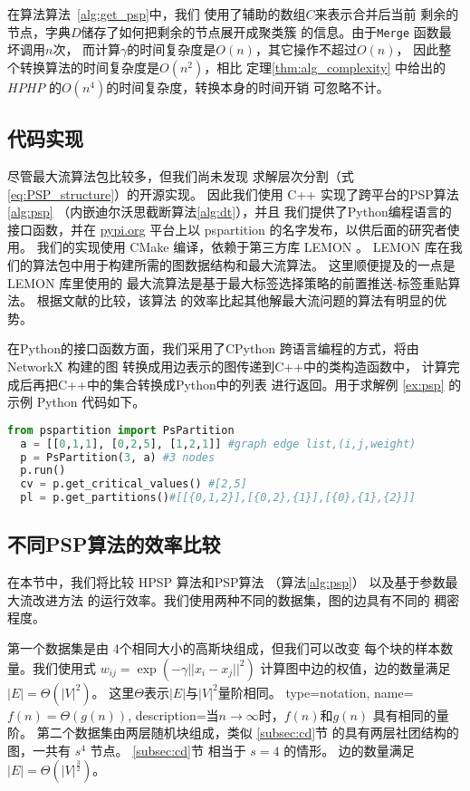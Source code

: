 在算法算法~\ref{alg:get_psp}中，我们
使用了辅助的数组$C$来表示合并后当前
剩余的节点，字典$D$储存了如何把剩余的节点展开成聚类簇
的信息。由于\texttt{Merge} 函数最坏调用$n$次，
而计算$\gamma$的时间复杂度是$O(n)$，其它操作不超过$O(n)$，
因此整个转换算法的时间复杂度是$O(n^2)$，相比
定理\ref{thm:alg_complexity}
中给出的$HPHP$ 的$O(n^4)$的时间复杂度，转换本身的时间开销
可忽略不计。

\subsection{代码实现}
尽管最大流算法包比较多，但我们尚未发现
求解层次分割（式\eqref{eq:PSP_structure}）的开源实现。
因此我们使用 C++ 实现了跨平台的PSP算法\ref{alg:psp}
（内嵌迪尔沃思截断算法\ref{alg:dt}），并且
我们提供了Python编程语言的接口函数，并在 \url{pypi.org}
平台上以 pspartition
的名字发布，以供后面的研究者使用。
我们的实现使用 CMake 编译，依赖于第三方库 LEMON \cite{dezsHo2011lemon}。 
LEMON 库在我们的算法包中用于构建所需的图数据结构和最大流算法。
这里顺便提及的一点是 LEMON 库里使用的
最大流算法是基于最大标签选择策略的前置推送-标签重贴算法。
根据文献\citet{ahuja1997computational}的比较，该算法
的效率比起其他解最大流问题的算法有明显的优势。

在Python的接口函数方面，我们采用了CPython
跨语言编程的方式，将由 NetworkX \cite{SciPyProceedings_11} 构建的图
转换成用边表示的图传递到C++中的类构造函数中，
计算完成后再把C++中的集合转换成Python中的列表
进行返回。用于求解例 \ref{ex:psp}
的示例 Python 代码如下。
\begin{lstlisting}[language=Python]
  from pspartition import PsPartition
  a = [[0,1,1], [0,2,5], [1,2,1]] #graph edge list,(i,j,weight)
  p = PsPartition(3, a) #3 nodes
  p.run()
  cv = p.get_critical_values() #[2,5]
  pl = p.get_partitions()#[[{0,1,2}],[{0,2},{1}],[{0},{1},{2}]]
\end{lstlisting}

\subsection{不同PSP算法的效率比较}
在本节中，我们将比较 HPSP 算法和PSP算法
（算法\ref{alg:psp}）
以及基于参数最大流改进方法\cite{kolmogorov}
的运行效率。我们使用两种不同的数据集，图的边具有不同的
稠密程度。

第一个数据集是由
4个相同大小的高斯块组成，但我们可以改变
每个块的样本数量。我们使用式
  $w_{ij}=\exp(-\gamma ||x_i-x_j||^2)$
计算图中边的权值，边的数量满足 $|E|=\Theta(|V|^2)$。
这里$\Theta$表示$|E|$与$|V|^2$量阶相同。
{
  type=notation,
  name={$f(n)=\Theta(g(n))$},
  description={当$n\to \infty$时，$f(n)$和$g(n)$ 具有相同的量阶。}
}
第二个数据集由两层随机块组成，类似 \ref{subsec:cd}节
的具有两层社团结构的图，一共有 $s^4$ 节点。
\ref{subsec:cd}节 相当于 $s=4$ 的情形。
边的数量满足 $|E|=\Theta(|V|^{\frac{3}{2}})$。

